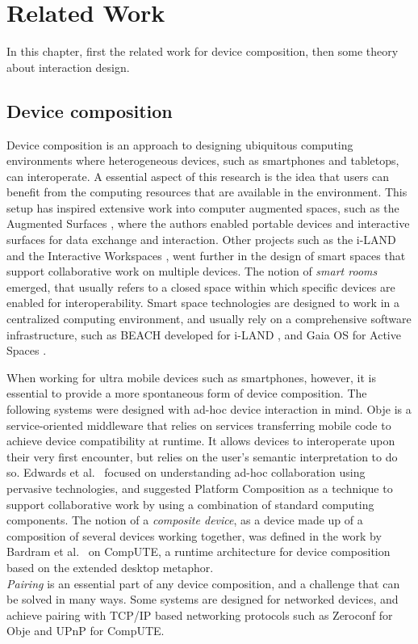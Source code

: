 \chapter{Related Work}
\label{relatedwork}

In this chapter, first the related work for device composition, then some theory about interaction design.

\section{Device composition}

Device composition is an approach to designing ubiquitous computing environments where heterogeneous devices, such as smartphones and tabletops, can interoperate.
A essential aspect of this research is the idea that users can benefit from the computing resources that are available in the environment.
This setup has inspired extensive work into computer augmented spaces, such as the Augmented Surfaces \citep{Rekimoto:1999:augmentedsurfaces}, where the authors enabled portable devices and interactive surfaces for data exchange and interaction.
Other projects such as the i-LAND \citep{Streitz:1999:iland} and the Interactive Workspaces \citep{Johanson:2002:iroom}, went further in the design of smart spaces that support collaborative work on multiple devices.
The notion of \emph{smart rooms} emerged, that usually refers to a closed space within which specific devices are enabled for interoperability.
Smart space technologies are designed to work in a centralized computing environment, and usually rely on a comprehensive software infrastructure, such as BEACH developed for i-LAND \citep{Tandler:2001:smartenv}, and Gaia OS for Active Spaces \citep{Roman:2002:gaia}.

When working for ultra mobile devices such as smartphones, however, it is essential to provide a more spontaneous form of device composition.
The following systems were designed with ad-hoc device interaction in mind.
Obje \citep{Edwards:2009:obje} is a service-oriented middleware that relies on services transferring mobile code to achieve device compatibility at runtime.
It allows devices to interoperate upon their very first encounter, but relies on the user's semantic interpretation to do so.
Edwards et al.\ \citeyearpar{Pering:2009:platformcomp} focused on understanding ad-hoc collaboration using pervasive technologies, and suggested Platform Composition as a technique to support collaborative work by using a combination of standard computing components.
The notion of a \emph{composite device}, as a device made up of a composition of several devices working together, was defined in the work by Bardram et al.\ \citeyearpar{Bardram:2010:compute} on CompUTE, a runtime architecture for device composition based on the extended desktop metaphor.
\\
\linebreak
\emph{Pairing} is an essential part of any device composition, and a challenge that can be solved in many ways.
Some systems are designed for networked devices, and achieve pairing with TCP/IP based networking protocols such as Zeroconf \citeyearpar{zeroconf} for Obje and UPnP \citeyearpar{upnp} for CompUTE.

